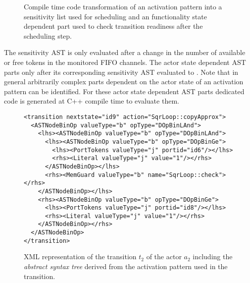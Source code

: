 \begin{figure}[h]
\centering
\resizebox{\columnwidth}{!}{}
%
\caption{\label{fig:ast-compile-time-transform}%
Compile time code transformation of an activation pattern into a sensitivity list used for scheduling and an functionality state dependent part used to check transition readiness after the scheduling step.
}
\end{figure}

The sensitivity AST is only evaluated after a change in the number of available or free tokens in the monitored FIFO channels.
The actor state dependent AST parts only after its corresponding sensitivity AST evaluated to .
Note that in general arbitrarily complex parts dependent on the actor state of an activation pattern can be identified.
For these actor state dependent AST parts dedicated code is generated at C++ compile time to evaluate them.

\begin{figure}[h]
\begin{verbatim}
<transition nextstate="id9" action="SqrLoop::copyApprox">
  <ASTNodeBinOp valueType="b" opType="DOpBinLAnd">
    <lhs><ASTNodeBinOp valueType="b" opType="DOpBinLAnd">
      <lhs><ASTNodeBinOp valueType="b" opType="DOpBinGe">
        <lhs><PortTokens valueType="j" portid="id6"/></lhs>
        <rhs><Literal valueType="j" value="1"/></rhs>
      </ASTNodeBinOp></lhs>
      <rhs><MemGuard valueType="b" name="SqrLoop::check"></rhs>
    </ASTNodeBinOp></lhs>
    <rhs><ASTNodeBinOp valueType="b" opType="DOpBinGe">
      <lhs><PortTokens valueType="j" portid="id8"/></lhs>
      <rhs><Literal valueType="j" value="1"/></rhs>
    </ASTNodeBinOp></rhs>
  </ASTNodeBinOp>
</transition>
\end{verbatim}
\caption{\label{fig:xml-t2-sqrloop}%
XML representation of the transition $t_2$ of the  actor $a_2$ including the \emph{abstract syntax tree} derived from the activation pattern used in the transition.
}
\end{figure}




